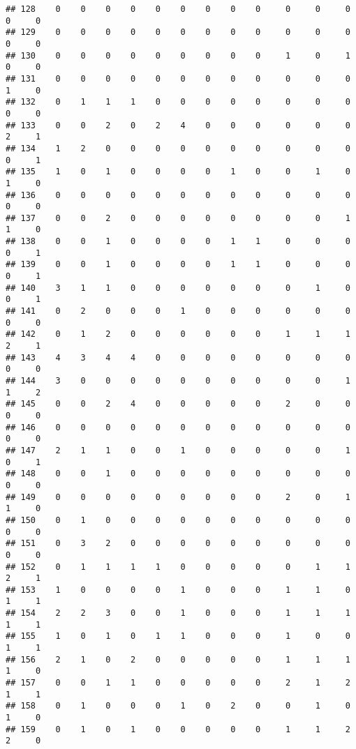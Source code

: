 \documentclass[
]{article}
\begin{document}
\begin{verbatim}
## 128    0    0    0    0    0    0    0    0    0     0     0     0     0     0
## 129    0    0    0    0    0    0    0    0    0     0     0     0     0     0
## 130    0    0    0    0    0    0    0    0    0     1     0     1     0     0
## 131    0    0    0    0    0    0    0    0    0     0     0     0     1     0
## 132    0    1    1    1    0    0    0    0    0     0     0     0     0     0
## 133    0    0    2    0    2    4    0    0    0     0     0     0     2     1
## 134    1    2    0    0    0    0    0    0    0     0     0     0     0     1
## 135    1    0    1    0    0    0    0    1    0     0     1     0     1     0
## 136    0    0    0    0    0    0    0    0    0     0     0     0     0     0
## 137    0    0    2    0    0    0    0    0    0     0     0     1     1     0
## 138    0    0    1    0    0    0    0    1    1     0     0     0     0     1
## 139    0    0    1    0    0    0    0    1    1     0     0     0     0     1
## 140    3    1    1    0    0    0    0    0    0     0     1     0     0     1
## 141    0    2    0    0    0    1    0    0    0     0     0     0     0     0
## 142    0    1    2    0    0    0    0    0    0     1     1     1     2     1
## 143    4    3    4    4    0    0    0    0    0     0     0     0     0     0
## 144    3    0    0    0    0    0    0    0    0     0     0     1     1     2
## 145    0    0    2    4    0    0    0    0    0     2     0     0     0     0
## 146    0    0    0    0    0    0    0    0    0     0     0     0     0     0
## 147    2    1    1    0    0    1    0    0    0     0     0     1     0     1
## 148    0    0    1    0    0    0    0    0    0     0     0     0     0     0
## 149    0    0    0    0    0    0    0    0    0     2     0     1     1     0
## 150    0    1    0    0    0    0    0    0    0     0     0     0     0     0
## 151    0    3    2    0    0    0    0    0    0     0     0     0     0     0
## 152    0    1    1    1    1    0    0    0    0     0     1     1     2     1
## 153    1    0    0    0    0    1    0    0    0     1     1     0     1     1
## 154    2    2    3    0    0    1    0    0    0     1     1     1     1     1
## 155    1    0    1    0    1    1    0    0    0     1     0     0     1     1
## 156    2    1    0    2    0    0    0    0    0     1     1     1     1     0
## 157    0    0    1    1    0    0    0    0    0     2     1     2     1     1
## 158    0    1    0    0    0    1    0    2    0     0     1     0     1     0
## 159    0    1    0    1    0    0    0    0    0     1     1     2     2     0

\end{verbatim}
\end{document}
